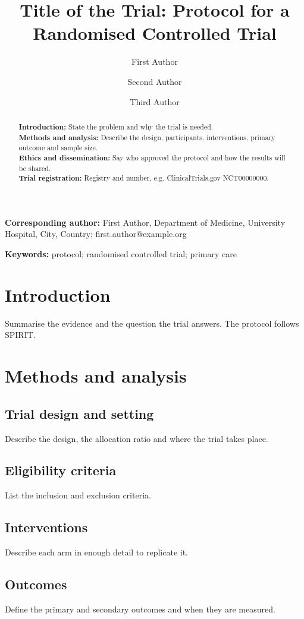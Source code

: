 \documentclass[11pt,a4paper]{article}
\title{Title of the Trial: Protocol for a Randomised Controlled Trial}
\author[1]{First Author}
\author[1,2]{Second Author}
\author[2]{Third Author}
\affil[1]{Department of Medicine, University Hospital, City, Country}
\affil[2]{School of Public Health, University, City, Country}
\date{}
\begin{document}
\maketitle

\noindent\textbf{Corresponding author:} First Author, Department of Medicine,
University Hospital, City, Country; first.author@example.org

\begin{abstract}
\noindent\textbf{Introduction:} State the problem and why the trial is needed.\\
\textbf{Methods and analysis:} Describe the design, participants, interventions, primary outcome and sample size.\\
\textbf{Ethics and dissemination:} Say who approved the protocol and how the results will be shared.\\
\textbf{Trial registration:} Registry and number, e.g. ClinicalTrials.gov NCT00000000.
\end{abstract}

\noindent\textbf{Keywords:} protocol; randomised controlled trial; primary care

\section{Introduction}
Summarise the evidence and the question the trial answers. The protocol follows
SPIRIT.\cite{chan2013spirit}

\section{Methods and analysis}
\subsection{Trial design and setting}
Describe the design, the allocation ratio and where the trial takes place.

\subsection{Eligibility criteria}
List the inclusion and exclusion criteria.

\subsection{Interventions}
Describe each arm in enough detail to replicate it.

\subsection{Outcomes}
Define the primary and secondary outcomes and when they are measured.
\end{document}

